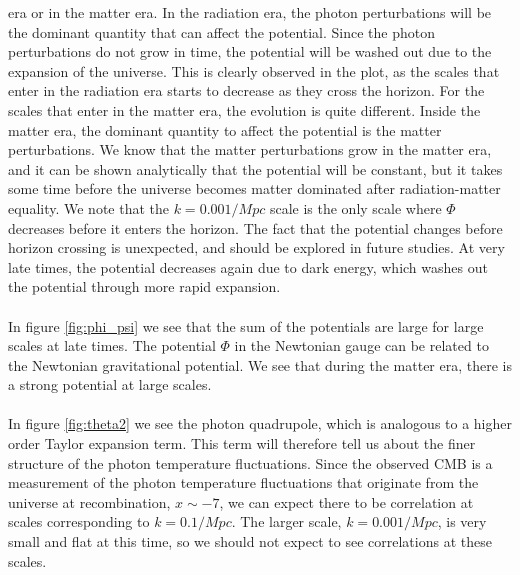 \documentclass{aa}
\begin{document}
era or in the matter era. In the radiation era, the photon perturbations will be the dominant quantity that can affect the potential. 
Since the photon perturbations do not grow in time, the potential will be washed out due to the expansion of the universe.
This is clearly observed in the plot, as the scales that enter in the radiation era starts to decrease as they cross the horizon. For the scales that enter in 
the matter era, the evolution is quite different. Inside the matter era, the dominant quantity to affect the potential is the matter perturbations. We know that the matter
perturbations grow in the matter era, and it can be shown analytically that the potential will be constant, but it takes some time before the universe becomes
matter dominated after radiation-matter equality. We note that the $k = 0.001/Mpc$ scale is the only scale where $\Phi$
decreases before it enters the horizon. 
The fact that the potential changes before horizon crossing is unexpected, and should be explored in future studies.
At very late times, the potential decreases again due to dark energy,
which washes out the potential through more rapid expansion.\\
\\
In figure \ref{fig:phi_psi} we see that the sum of the potentials are large for large scales at late times. The potential $\Phi$ in the Newtonian gauge can be related 
to the Newtonian gravitational potential. We see that during the matter era, there is a strong potential at large scales.\\
\\
In figure \ref{fig:theta2} we see the photon quadrupole, which is analogous to a higher order Taylor expansion term. This term will therefore tell us about the 
finer structure of the photon temperature fluctuations. Since the observed CMB is a measurement of the photon temperature fluctuations that originate
from the universe at recombination, $x \sim -7$, we can expect there to be correlation at scales corresponding to $k = 0.1/Mpc$. The larger scale, $k = 0.001/Mpc$, 
is very small and flat at this time, so we should not expect to see correlations at these scales.    


\end{document}
